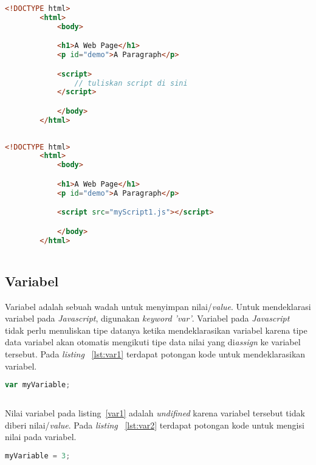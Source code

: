 \begin{lstlisting}[language=HTML, caption=\textit{Internal Javascript}, label={lst:script1}]
	<!DOCTYPE html>
		<html>
			<body> 

			<h1>A Web Page</h1>
			<p id="demo">A Paragraph</p>

			<script>
				// tuliskan script di sini
			</script>

			</body>
		</html>
		
\end{lstlisting}

\begin{lstlisting}[language=HTML, caption=\textit{External Javascript}, label={lst:script2}]
	<!DOCTYPE html>
		<html>
			<body> 

			<h1>A Web Page</h1>
			<p id="demo">A Paragraph</p>

			<script src="myScript1.js"></script>

			</body>
		</html>
	
\end{lstlisting}

\subsection{Variabel}
Variabel adalah sebuah wadah untuk menyimpan nilai/\textit{value}. Untuk mendeklarasi variabel pada \textit{Javascript}, digunakan \textit{keyword 'var'}. Variabel pada \textit{Javascript} tidak perlu menuliskan tipe datanya ketika mendeklarasikan variabel karena tipe data variabel akan otomatis mengikuti tipe data nilai yang di\textit{assign} ke variabel tersebut.  Pada \textit{listing} ~\ref{lst:var1} terdapat potongan kode untuk mendeklarasikan variabel.

\begin{lstlisting}[language=Javascript, caption=Deklarasi variabel, label={lst:var1}]
	var myVariable;
	
\end{lstlisting}

Nilai variabel pada listing~\ref{var1} adalah \textit{undifined} karena variabel tersebut tidak diberi nilai/\textit{value}. Pada \textit{listing} ~\ref{lst:var2} terdapat potongan kode untuk mengisi nilai pada variabel. 

\begin{lstlisting}[language=Javascript, caption=Mengisi nilai sebuah variabel, label={lst:var2}]
	myVariable = 3;	
	
\end{lstlisting}

